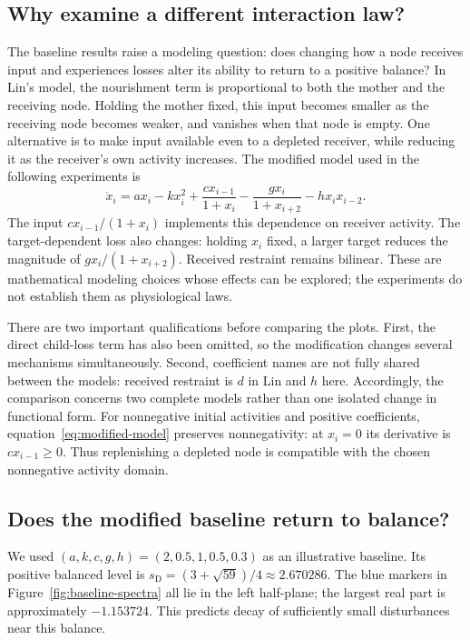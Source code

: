 \subsection{Why examine a different interaction law?}
The baseline results raise a modeling question: does changing how a node
receives input and experiences losses alter its ability to return to a
positive balance? In Lin's model, the nourishment term is proportional to
both the mother and the receiving node. Holding the mother fixed, this
input becomes smaller as the receiving node becomes weaker, and vanishes
when that node is empty. One alternative is to make input available even
to a depleted receiver, while reducing it as the receiver's own activity
increases. The modified model used in the following experiments is
\begin{equation}
 \dot x_i=a x_i-kx_i^2+\frac{c x_{i-1}}{1+x_i}
                  -\frac{g x_i}{1+x_{i+2}}-h x_i x_{i-2}.
 \label{eq:modified-model}
\end{equation}
The input $c x_{i-1}/(1+x_i)$ implements this dependence on receiver
activity. The target-dependent loss also changes: holding $x_i$ fixed,
a larger target reduces the magnitude of $g x_i/(1+x_{i+2})$.
Received restraint remains bilinear. These are mathematical modeling
choices whose effects can be explored; the experiments do not establish
them as physiological laws.

There are two important qualifications before comparing the plots.
First, the direct child-loss term has also been omitted, so the modification
changes several mechanisms simultaneously. Second, coefficient names are
not fully shared between the models: received restraint is $d$ in Lin and
$h$ here. Accordingly, the comparison concerns two complete models rather
than one isolated change in functional form. For nonnegative initial
activities and positive coefficients, equation~\eqref{eq:modified-model}
preserves nonnegativity: at $x_i=0$ its derivative is
$c x_{i-1}\geq0$. Thus replenishing a depleted node is compatible with the
chosen nonnegative activity domain.

\subsection{Does the modified baseline return to balance?}
We used $(a,k,c,g,h)=(2,0.5,1,0.5,0.3)$ as an illustrative baseline.
Its positive balanced level is
$s_{\mathrm D}=(3+\sqrt{59})/4\approx2.670286$.
The blue markers in Figure~\ref{fig:baseline-spectra} all lie in the left
half-plane; the largest real part is approximately $-1.153724$.
This predicts decay of sufficiently small disturbances near this balance.

